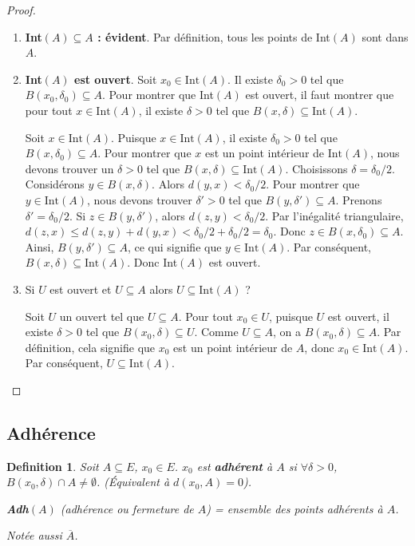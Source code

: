 \documentclass{article}
\newtheorem{definition}{Definition}
\begin{document}
\begin{proof}
\begin{enumerate}
    \item \textbf{Int$(A) \subseteq A$ : évident}. Par définition, tous les points de Int$(A)$ sont dans $A$.
    \item \textbf{Int$(A)$ est ouvert}. Soit $x_0 \in \text{Int}(A)$. Il existe $\delta_0 > 0$ tel que $B(x_0, \delta_0) \subseteq A$. Pour montrer que Int$(A)$ est ouvert, il faut montrer que pour tout $x \in \text{Int}(A)$, il existe $\delta > 0$ tel que $B(x, \delta) \subseteq \text{Int}(A)$.

    Soit $x \in \text{Int}(A)$. Puisque $x \in \text{Int}(A)$, il existe $\delta_0 > 0$ tel que $B(x, \delta_0) \subseteq A$.
    Pour montrer que $x$ est un point intérieur de $\text{Int}(A)$, nous devons trouver un $\delta > 0$ tel que $B(x, \delta) \subseteq \text{Int}(A)$.
    Choisissons $\delta = \delta_0/2$. Considérons $y \in B(x, \delta)$. Alors $d(y, x) < \delta_0/2$.
    Pour montrer que $y \in \text{Int}(A)$, nous devons trouver $\delta' > 0$ tel que $B(y, \delta') \subseteq A$.
    Prenons $\delta' = \delta_0/2$. Si $z \in B(y, \delta')$, alors $d(z, y) < \delta_0/2$.
    Par l'inégalité triangulaire, $d(z, x) \leq d(z, y) + d(y, x) < \delta_0/2 + \delta_0/2 = \delta_0$.
    Donc $z \in B(x, \delta_0) \subseteq A$. Ainsi, $B(y, \delta') \subseteq A$, ce qui signifie que $y \in \text{Int}(A)$.
    Par conséquent, $B(x, \delta) \subseteq \text{Int}(A)$. Donc Int$(A)$ est ouvert.

    \item Si $U$ est ouvert et $U \subseteq A$ alors $U \subseteq \text{Int}(A)$ ?

    Soit $U$ un ouvert tel que $U \subseteq A$. Pour tout $x_0 \in U$, puisque $U$ est ouvert, il existe $\delta > 0$ tel que $B(x_0, \delta) \subseteq U$. Comme $U \subseteq A$, on a $B(x_0, \delta) \subseteq A$. Par définition, cela signifie que $x_0$ est un point intérieur de $A$, donc $x_0 \in \text{Int}(A)$. Par conséquent, $U \subseteq \text{Int}(A)$.


\end{enumerate}
\end{proof}


\subsection{Adhérence}

\begin{definition}
Soit $A \subseteq E$, $x_0 \in E$. $x_0$ est \textbf{adhérent} à $A$ si $\forall \delta > 0$, $B(x_0, \delta) \cap A \neq \emptyset$. (Équivalent à $d(x_0, A) = 0$).

\textbf{Adh$(A)$} (adhérence ou fermeture de $A$) = ensemble des points adhérents à $A$.

Notée aussi $\overline{A}$.
\end{definition}
\end{document}
